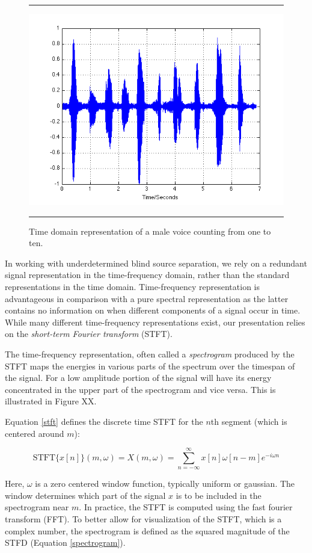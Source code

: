 \documentclass[11pt, oneside, a4paper]{report}
\begin{document}
\begin{figure}
  \centering
  \hrule
  \includegraphics[width = .8\textwidth]{Figures/time_signal}
  \caption{Time domain representation of a male voice counting from
    one to ten.}
  \hrule
\end{figure}



In working with underdetermined blind source separation, we
rely on a redundant signal representation in the time-frequency
domain, rather than the standard representations in the time
domain. Time-frequency representation is advantageous in comparison with a
pure spectral representation as the latter contains no information on
when different components of a signal occur in time. While many
different time-frequency representations exist, our presentation
relies on the \emph{short-term Fourier transform} (STFT).

The time-frequency representation, often called a \emph{spectrogram} produced by the STFT maps the
energies in various parts of the spectrum over the timespan of the
signal. For a low amplitude portion of the signal will have its energy
concentrated in the upper part of the spectrogram and vice versa. This
is illustrated in Figure XX.

Equation \ref{stft} defines the discrete time STFT for the $n$th
segment (which is centered around $m$):

\begin{equation}\label{stft}
  \text{STFT}\{x[n]\}(m,\omega)= X(m,\omega) =\sum_{n = -\infty}^{\infty}
  x[n]\omega[n-m]e^{-i\omega n}
\end{equation}

Here, $\omega$ is a zero centered window function, typically uniform
or gaussian. The window determines which part of the signal $x$ is to
be included in the spectrogram near $m$. In practice, the STFT is
computed using the fast fourier transform (FFT). To better allow for
visualization of the STFT, which is a complex number, the spectrogram
is defined as the squared magnitude of the STFD (Equation \ref{spectrogram}).
\end{document}
